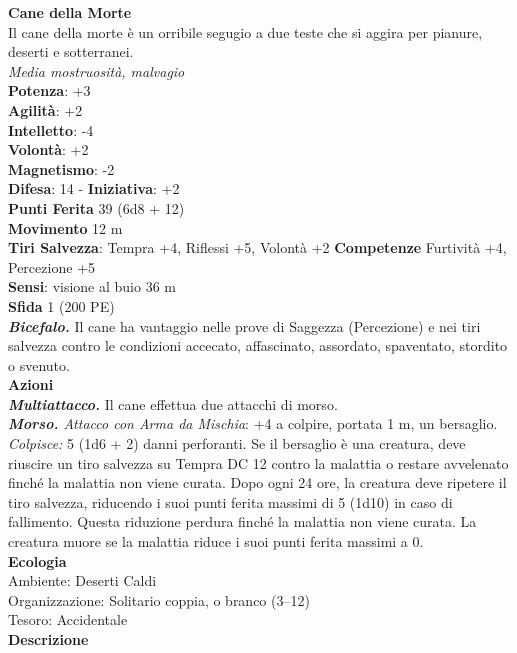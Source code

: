 \begin{multicols}{2}
\medskip\textbf{Cane della Morte}\\
Il cane della morte è un orribile segugio a due teste che si aggira per pianure, deserti e sotterranei.\\
\emph{Media mostruosità, malvagio}\\
\textbf{Potenza}: +3\\
\textbf{Agilità}: +2\\
\textbf{Intelletto}: -4\\
\textbf{Volontà}: +2\\
\textbf{Magnetismo}: -2\\
\textbf{Difesa}: 14 - \textbf{Iniziativa}: +2\\
\textbf{Punti Ferita} 39 (6d8 + 12)\\
\textbf{Movimento} 12 m\\
\textbf{Tiri Salvezza}: Tempra +4, Riflessi +5, Volontà +2 
\textbf{Competenze} Furtività +4, Percezione +5\\
\textbf{Sensi}: visione al buio 36 m\\
\textbf{Sfida} 1 (200 PE)\smallskip\\
\emph{\textbf{Bicefalo.}} Il cane ha vantaggio nelle prove di Saggezza (Percezione) e nei tiri salvezza contro le condizioni accecato, affascinato, assordato, spaventato, stordito o svenuto.\\
\smallskip\textbf{Azioni}\\
\emph{\textbf{Multiattacco.}} Il cane effettua due attacchi di morso.\\
\emph{\textbf{Morso.} Attacco con Arma da Mischia}: +4 a colpire, portata 1 m, un bersaglio.\\
\emph{Colpisce:} 5 (1d6 + 2) danni perforanti. Se il bersaglio è una creatura, deve riuscire un tiro salvezza su Tempra DC 12 contro la malattia o restare avvelenato finché la malattia non viene curata. Dopo ogni 24 ore, la creatura deve ripetere il tiro salvezza, riducendo i suoi punti ferita massimi di 5 (1d10) in caso di fallimento. Questa riduzione perdura finché la malattia non viene curata. La creatura muore se la malattia riduce i suoi punti ferita massimi a 0. \\
\textbf{Ecologia}\\
Ambiente: Deserti Caldi\\
Organizzazione: Solitario coppia, o branco (3–12)\\
Tesoro: Accidentale\\
\textbf{Descrizione}\\

\end{multicols}

